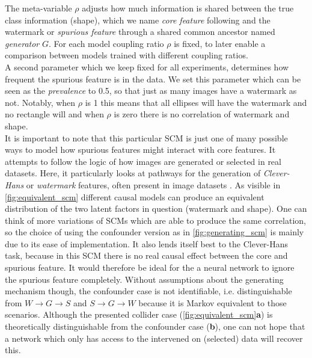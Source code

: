 The meta-variable $\rho$ adjusts how much information is shared between the true class information (shape), which we name \textit{core feature} following \cite{Singla2022} and the watermark or \textit{spurious feature} through a shared common ancestor named \textit{generator} $G$. For each model coupling ratio $\rho$ is fixed, to later enable a comparison between models trained with different coupling ratios. \\

A second parameter which we keep fixed for all experiments, determines how frequent the spurious feature is in the data. We set this parameter which can be seen as the \textit{prevalence} to 0.5, so that just as many images have a watermark as not. Notably, when $\rho$ is 1 this means that all ellipses will have the watermark and no rectangle will and when $\rho$ is zero there is no correlation of watermark and shape. \\

It is important to note that this particular SCM is just one of many possible ways to model how spurious features might interact with core features. It attempts to follow the logic of how images are generated or selected in real datasets. Here, it particularly looks at pathways for the generation of \textit{Clever-Hans} or \textit{watermark} features, often present in image datasets \cite{Lapuschkin2019}. As visible in \cref{fig:equivalent_scm} different causal models can produce an equivalent distribution of the two latent factors in question (watermark and shape). One can think of more variations of SCMs which are able to produce the same correlation, so the choice of using the confounder version as in \cref{fig:generating_scm} is mainly due to its ease of implementation. It also lends itself best to the Clever-Hans task, because in this SCM there is no real causal effect between the core and spurious feature. It would therefore be ideal for the a neural network to ignore the spurious feature completely. Without assumptions about the generating mechanism though, the confounder case is not identifiable, i.e. distinguishable from $W \rightarrow G \rightarrow S$ and $S \rightarrow G \rightarrow W$ because it is Markov equivalent to those scenarios. 
Although the presented collider case (\cref{fig:equivalent_scm}\textbf{a}) is theoretically distinguishable from the confounder case (\textbf{b}), one can not hope that a network which only has access to the intervened on (selected) data will recover this. 

